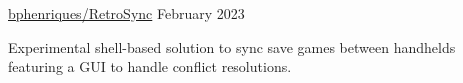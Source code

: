 \begin{cventries}
  \vspace{2mm}

\openSourceEntry
    {\href{https://github.com/bphenriques/knowledge-base}{bphenriques/RetroSync}}
    {February 2023}
    {   
    \begin{openSourceDescription}
    Experimental shell-based solution to sync save games between handhelds featuring a GUI to handle conflict resolutions.
    \end{openSourceDescription}
    \vspace{4mm}
    }
    
\end{cventries}
